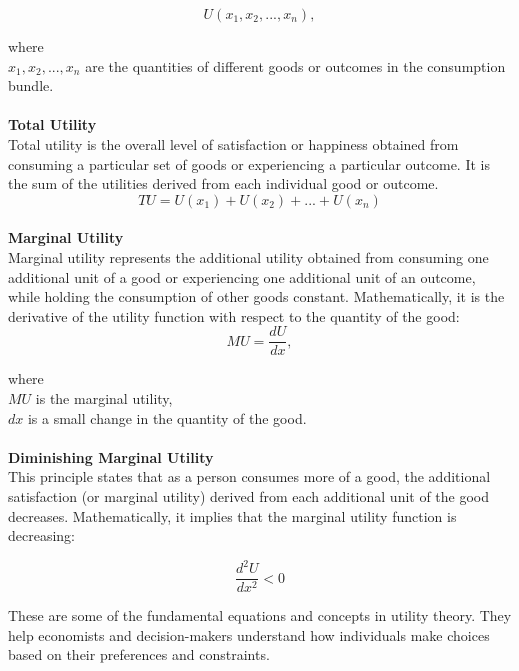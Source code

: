 \documentclass[12pt]{article}
\begin{document}
\begin{equation}
    U(x_1, x_2, ..., x_n),
\end{equation}

\noindent where\\
 \( x_1, x_2, ..., x_n \) are the quantities of different goods or outcomes in the
consumption bundle.\\
\\
\textbf{Total Utility}\\
Total utility is the overall level of satisfaction or happiness obtained from
consuming a particular set of goods or experiencing a particular outcome.
It is the sum of the utilities derived from each individual good or outcome.\\

\begin{equation}
    TU = U(x_1) + U(x_2) + ... + U(x_n)
\end{equation}
\\
\textbf{Marginal Utility}\\
Marginal utility represents the additional utility obtained from consuming one
additional unit of a good or experiencing one additional unit of an outcome,
while holding the consumption of other goods constant. Mathematically, it is
the derivative of the utility function with respect to the quantity of the good:\\

\begin{equation}
    MU = \frac{dU}{dx},
\end{equation}

\noindent where\\
\( MU \) is the marginal utility,\\
\( dx \) is a small change in the quantity of the good.\\
\\
\textbf{Diminishing Marginal Utility}\\
This principle states that as a person consumes more of a good, the additional
satisfaction (or marginal utility) derived from each additional unit of the good decreases.
Mathematically, it implies that the marginal utility function is decreasing:

\begin{equation}
    \frac{d^2U}{dx^2} < 0
\end{equation}

\noindent These are some of the fundamental equations and concepts in utility theory.
They help economists and decision-makers understand how individuals make choices based
on their preferences and constraints.
\end{document}
